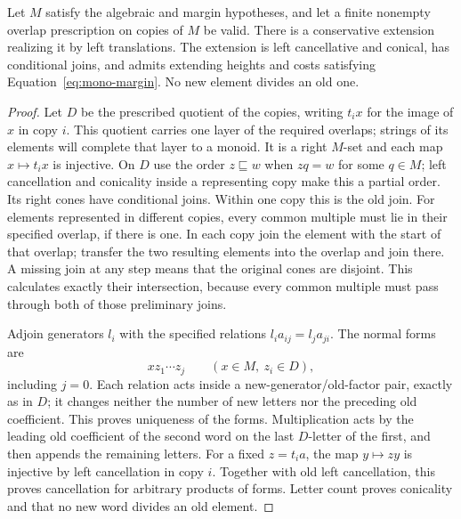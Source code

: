 \begin{lemma}\label{lem:mono-merger}
Let $M$ satisfy the algebraic and margin hypotheses, and let a finite
nonempty overlap prescription on copies of $M$ be valid.  There is a
conservative extension realizing it by left translations.  The
extension is left cancellative and conical, has conditional joins,
and admits extending heights and costs satisfying
Equation~\eqref{eq:mono-margin}.  No new element divides an old one.
\end{lemma}
\begin{proof}
Let $D$ be the prescribed quotient of the copies, writing $t_i x$
for the image of $x$ in copy $i$.  This quotient carries one layer
of the required overlaps; strings of its elements will complete that
layer to a monoid.  It is a right $M$-set and each
map $x\mapsto t_i x$ is injective.  On $D$ use the order
$z\sqsubseteq w$ when $zq=w$ for some $q\in M$; left cancellation
and conicality inside a representing copy make this a partial order.
Its right cones have conditional joins.  Within one copy this is the
old join.  For elements represented in different copies, every common
multiple must lie in their specified overlap, if there is one.
In each copy join the element with the start of that overlap; transfer
the two resulting elements into the overlap and join there.  A missing
join at any step means that the original cones are disjoint.  This
calculates exactly their intersection, because every common multiple
must pass through both of those preliminary joins.

Adjoin generators $l_i$ with the specified relations
$l_i a_{ij}=l_j a_{ji}$.  The normal forms are
\begin{equation}\label{eq:mono-merger-forms}
 xz_1\cdots z_j\qquad(x\in M,\ z_i\in D),
\end{equation}
including $j=0$.  Each relation acts inside a new-generator/old-factor
pair, exactly as in $D$; it changes neither the number of new letters
nor the preceding old coefficient.  This proves uniqueness of the
forms.  Multiplication acts by the leading old coefficient of the
second word on the last $D$-letter of the first, and then appends the
remaining letters.  For a fixed $z=t_i a$, the map $y\mapsto zy$
is injective by left cancellation in copy $i$.  Together with old
left cancellation, this proves cancellation for arbitrary products of
forms.  Letter count proves conicality and that no new word divides
an old element.


\end{proof}
